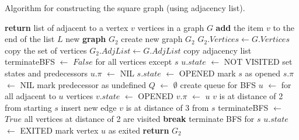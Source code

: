 \documentclass[11pt]{article}
\begin{document}
\begin{algorithm}
\caption{Algorithm for constructing the square graph (using adjacency list).}
\begin{algorithmic}[1]
\State \textbf{return} list of adjacent to a vertex $v$ vertices in a graph $G$
\EndProcedure
\Statex
{}
\State \textbf{add} the item $v$ to the end of the list $L$ 
\EndProcedure
\Statex
{}
\State new \textbf{graph} $G_{2}$
\Comment create new graph $G_{2}$ 
\State $G_{2}.Vertices \gets G.Vertices$ \Comment copy the set of vertices
\State $G_{2}.AdjList \gets G.AdjList$  \Comment copy adjacency list
\State terminateBFS $\gets$ $False$ 
 \Comment for all vertices except $s$
\State $u.state$ $\gets$ NOT VISITED \Comment set states and predecessors 
\State $u.\pi$ $\gets$ NIL 
\EndFor
\State $s.state$ $\gets$ OPENED \Comment mark $s$ as opened 
\State $s.\pi$ $\gets$ NIL \Comment mark predecessor as undefined
\State $Q$ $\gets$ $\emptyset$ \Comment create queue for BFS
\State {} 
\State $u$ $\gets$  
\Comment for all adjacent to $u$ vertices
\State $v.state$ $\gets$ OPENED  
\State $v.\pi$ $\gets$ $u$ 
\State {} 
 \Comment $v$ is at distance of 2 from starting $s$
\State {} \Comment insert new edge
\Comment $v$ is at distance of 3 from $s$
\State terminateBFS $\gets$ $True$ \Comment all vertices at distance of 2 are visited
\State \textbf{break} \Comment terminate BFS for $s$
\EndIf
\EndIf
\State $u.state$ $\gets$ EXITED \Comment mark vertex $u$ as exited
\EndFor
\EndWhile
\EndFor
\State \textbf{return} $G_{2}$
\EndProcedure
\end{algorithmic}
\end{algorithm}
\end{document}
